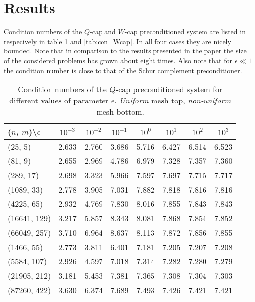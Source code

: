 \documentclass[10pt, a4paper]{article}
\begin{document}
\section*{Results}
Condition numbers of the $Q$-cap and $W$-cap preconditioned system are listed in respecively in table \ref{tab:con_Qcap}
and \ref{tab:con_Wcap}. In all four cases they are nicely bounded. Note that in comparison to the
results presented in the paper the size of the considered problems has grown about eight times. Also note that for $\epsilon \ll 1$ the 
condition number is close to that of the Schur complement preconditioner.
\begin{table}[ht]
  \caption{Condition numbers of the $Q$-cap preconditioned system for different values of parameter 
$\epsilon$. \textit{Uniform} mesh top, \textit{non-uniform} mesh bottom.
}
\label{tab:con_Qcap}
\footnotesize{
\begin{tabular}{l|ccccccc}
\hline
($n$, $m$)\textbackslash $\epsilon$ & $10^{-3}$ & $10^{-2}$ & $10^{-1}$ & $10^{0}$ & $10^{1}$ & $10^{2}$ & $10^{3}$\\
\hline
(25, 5) & 2.633 & 2.760 & 3.686 & 5.716 & 6.427 & 6.514 & 6.523\\
(81, 9) & 2.655 & 2.969 & 4.786 & 6.979 & 7.328 & 7.357 & 7.360\\
(289, 17) & 2.698 & 3.323 & 5.966 & 7.597 & 7.697 & 7.715 & 7.717\\
(1089, 33) & 2.778 & 3.905 & 7.031 & 7.882 & 7.818 & 7.816 & 7.816\\
(4225, 65) & 2.932 & 4.769 & 7.830 & 8.016 & 7.855 & 7.843 & 7.843\\
(16641, 129) & 3.217 & 5.857 & 8.343 & 8.081 & 7.868 & 7.854 & 7.852\\
(66049, 257) & 3.710 & 6.964 & 8.637 & 8.113 & 7.872 & 7.856 & 7.855\\
\hline
\hline
(1466, 55) & 2.773 & 3.811 & 6.401 & 7.181 & 7.205 & 7.207 & 7.208\\
(5584, 107) & 2.926 & 4.597 & 7.018 & 7.314 & 7.282 & 7.280 & 7.279\\
(21905, 212) & 3.181 & 5.453 & 7.381 & 7.365 & 7.308 & 7.304 & 7.303\\
(87260, 422) & 3.630 & 6.374 & 7.689 & 7.493 & 7.426 & 7.421 & 7.421\\
\hline
\end{tabular}
}
\end{table}
%
\end{document}
